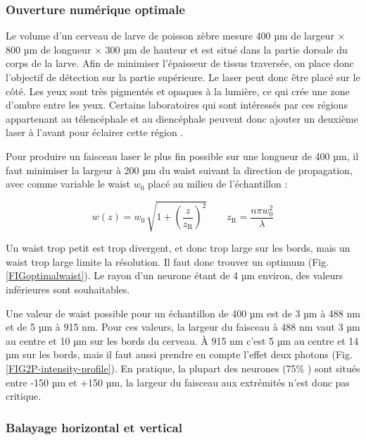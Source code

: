 \subsubsection{Ouverture numérique optimale}

Le volume d'un cerveau de larve de poisson zèbre mesure 400 µm de largeur × 800 µm de longueur × 300 µm de hauteur et est situé dans la partie dorsale du corps de la larve. Afin de minimiser l'épaisseur de tissus traversée, on place donc l'objectif de détection sur la partie supérieure. Le laser peut donc être placé sur le côté. Les yeux sont très pigmentés et opaques à la lumière, ce qui crée une zone d'ombre entre les yeux. Certains laboratoires qui sont intéressés par ces régions appartenant au télencéphale et au diencéphale peuvent donc ajouter un deuxième laser à l'avant pour éclairer cette région \cite{vladimirov_light-sheet_2014}.

Pour produire un faisceau laser le plus fin possible sur une longueur de 400 µm, il faut minimiser la largeur à 200 µm du waist suivant la direction de propagation, avec comme variable le waist $w_0$ placé au milieu de l'échantillon :

$$
w(z) = w_0 \, \sqrt{ 1+ {\left( \frac{z}{z_\mathrm{R}} \right)}^2 } \qquad z_\mathrm{R} = \frac{n \pi w_0^2 }{\lambda}
$$

Un waist trop petit est trop divergent, et donc trop large sur les bords, mais un waist trop large limite la résolution. Il faut donc trouver un optimum (Fig. \ref{FIGoptimalwaist}). Le rayon d'un neurone étant de 4 µm environ, des valeurs inférieures sont souhaitables.

Une valeur de waist possible pour un échantillon de 400 µm est de 3 µm à 488 nm et de 5 µm à 915 nm. Pour ces valeurs, la largeur du faisceau à 488 nm vaut 3 µm au centre et 10 µm sur les bords du cerveau. À 915 nm c'est 5 µm au centre et 14 µm sur les bords, mais il faut aussi prendre en compte l'effet deux photons (Fig. \ref{FIG2P-intensity-profile}). En pratique, la plupart des neurones (75\% \cite{panier_fast_2013}) sont situés entre -150 µm et +150 µm, la largeur du faisceau aux extrémités n'est donc pas critique.

\subsubsection{Balayage horizontal et vertical}

